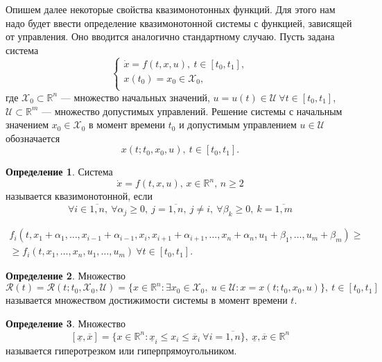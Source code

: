 \documentclass{article}
\renewcommand{\le}{\leqslant}
\renewcommand{\ge}{\geqslant}
\theoremstyle{definition}
\newtheorem{definition}{Определение}[section]
\begin{document}
Опишем далее некоторые свойства квазимонотонных функций. Для этого нам надо будет ввести определение квазимонотонной системы с функцией, зависящей от управления. Оно вводится аналогично стандартному случаю. Пусть задана система
\begin{equation} \label{usys}
	\begin{cases} 
		\dot x = f(t, x, u),\ t \in [t_0,t_1],\\
		x(t_0) = x_0 \in \mathcal{X}_0,\\
	\end{cases}
\end{equation}
где \(\mathcal{X}_0 \subset \mathbb{R}^n\) --- множество начальных значений, \(u = u(t) \in \mathcal{U}\ \forall t \in [t_0,t_1]\), \(\mathcal{U} \subset \mathbb{R}^m\) --- множество допустимых управлений. Решение системы с начальным значением \(x_0 \in \mathcal{X}_0\) в момент времени \(t_0\) и допустимым управлением \(u \in \mathcal{U}\) обозначается
\[
x(t; t_0, x_0, u),\ t \in [t_0,t_1].
\]
\begin{definition} 
	Система
	\begin{equation}
		\dot x = f(t, x, u),\, x \in \mathbb{R}^n,\, n \ge 2 
	\end{equation}
	называется квазимонотонной, если
	\[\forall i \in \overline{1,n},\ \forall \alpha_j \ge 0,\ j = \overline{1,n},\ j \ne i,\ \forall \beta_k \ge 0,\ k = \overline{1, m}\]

	\begin{multline}	\label{uqm}
		f_i(t, x_1+\alpha_1,\dots,x_{i-1} + \alpha_{i-1},x_i,x_{i+1}+\alpha_{i+1},\dots,x_n+\alpha_n, u_1 + \beta_1,\dots,u_m + \beta_m) \ge \\
		\ge f_i(t, x_1,\dots,x_n, u_1,\dots, u_m)\ \forall t \in [t_0,t_1].
	\end{multline}
\end{definition}


\begin{definition}
	Множество
	\[\mathcal{R}(t) = \mathcal{R}(t; t_0, \mathcal{X}_0, \mathcal{U}) = \{x \in \mathbb{R}^n: \exists x_0 \in \mathcal{X}_0,\ u \in \mathcal{U}: x = x(t; t_0, x_0, u)\},\ t \in [t_0,t_1]\]
	называется множеством достижимости системы в момент времени \(t\).
\end{definition}

\begin{definition} \label{hr}
	Множество
	\[
		[\underline{x}, \overline{x}] = \{x \in \mathbb{R}^n: \underline{x}_i \le x_i \le \overline{x}_i\ \forall i = \overline{1, n}\},\ \underline{x}, \overline{x} \in \mathbb{R}^n
	\]
	называется гиперотрезком или гиперпрямоугольником.
\end{definition}
\end{document}
